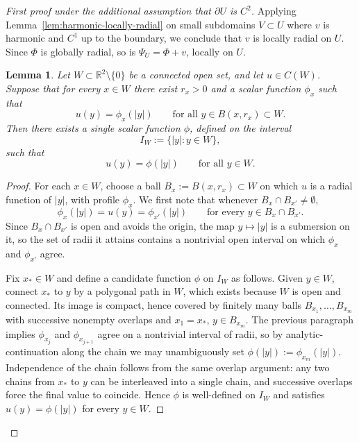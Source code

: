 \documentclass[a4paper,11pt,reqno]{amsart}
\numberwithin{equation}{section}
\theoremstyle{plain} %
\newtheorem{lemma}{Lemma}[section]
\theoremstyle{definition} %
\theoremstyle{remark}
\newcommand{\R}{\mathbb{R}}
\begin{document}
\begin{proof}[First proof under the additional assumption that $\partial U$ is $C^2$]
Applying Lemma~\ref{lem:harmonic-locally-radial} on small subdomains
$V\subset U$ where $v$ is harmonic and $C^1$ up to the boundary, we
conclude that $v$ is locally radial on $U$. Since $\Phi$ is globally
radial, so is $\Psi_U=\Phi+v$, locally on $U$.

\begin{lemma}\label{lem:local-to-global-radial}
Let \(W\subset \R^2\setminus\{0\}\) be a connected open set, and let
\(u\in C(W)\). Suppose that for every \(x\in W\) there exist \(r_x>0\)
and a scalar function \(\phi_x\) such that
\[
u(y)=\phi_x(|y|)
\qquad\text{for all } y\in B(x,r_x)\subset W.
\]
Then there exists a single scalar function \(\phi\), defined on the
interval
\[
I_W:=\{|y|:y\in W\},
\]
such that
\[
u(y)=\phi(|y|)
\qquad\text{for all } y\in W.
\]
\end{lemma}

\begin{proof}
For each \(x\in W\), choose a ball \(B_x:=B(x,r_x)\subset W\) on which
\(u\) is a radial function of \(|y|\), with profile $\phi_x$. We
first note that whenever $B_x\cap B_{x'}\ne\emptyset$,
\[
\phi_x(|y|)=u(y)=\phi_{x'}(|y|)
\qquad\text{for every }y\in B_x\cap B_{x'}.
\]
Since $B_x\cap B_{x'}$ is open and avoids the origin, the map $y\mapsto
|y|$ is a submersion on it, so the set of radii it attains contains a
nontrivial open interval on which $\phi_x$ and $\phi_{x'}$ agree.

Fix $x_*\in W$ and define a candidate function $\phi$ on $I_W$ as
follows. Given $y\in W$, connect $x_*$ to $y$ by a polygonal path in
$W$, which exists because $W$ is open and connected. Its image is
compact, hence covered by finitely many balls
$B_{x_1},\dots,B_{x_m}$ with successive nonempty overlaps and
$x_1=x_*$, $y\in B_{x_m}$. The previous paragraph implies $\phi_{x_j}$
and $\phi_{x_{j+1}}$ agree on a nontrivial interval of radii, so by
analytic-continuation along the chain we may unambiguously set
$\phi(|y|):=\phi_{x_m}(|y|)$. Independence of the chain follows from
the same overlap argument: any two chains from $x_*$ to $y$ can be
interleaved into a single chain, and successive overlaps force the
final value to coincide. Hence $\phi$ is well-defined on $I_W$ and
satisfies $u(y)=\phi(|y|)$ for every $y\in W$.
\end{proof}


\end{proof}
\end{document}
